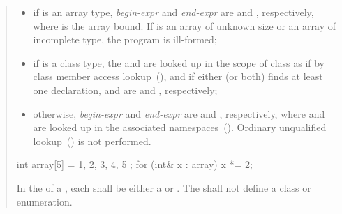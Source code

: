 \begin{quote}
\begin{itemize}
\item if  is an array type, \textit{begin-expr} and \textit{end-expr} are
 and , respectively, where  is
the array bound. If  is an array of unknown size or an array of
incomplete type, the program is ill-formed;

\item if  is a class type, the 
 and  are looked up in the scope of class 
as if by class member access lookup~(), and if either
(or both) finds at least one declaration,  and
 are  and ,
respectively;

\item otherwise, \textit{begin-expr} and \textit{end-expr} are 
and , respectively, where  and  are looked
up in the associated namespaces~().
\enternote Ordinary unqualified lookup~() is not
performed. \exitnote
\end{itemize}

\enterexample
\begin{codeblock}
int array[5] = { 1, 2, 3, 4, 5 };
for (int& x : array)
  x *= 2;
\end{codeblock}
\exitexample%

\pnum
In the  of a ,
each  shall be either a 
or . The  shall not define a
class or enumeration.
\end{quote}

